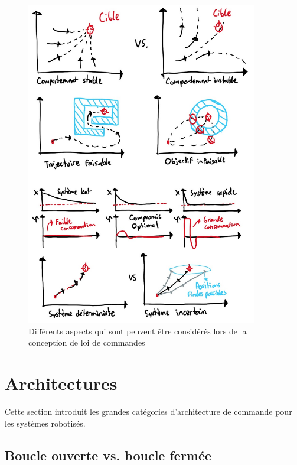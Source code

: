 \begin{figure}[htbp]
	\centering
	\includegraphics[width=0.9\textwidth]{fig/controlgoal.jpg}
	\caption{Différents aspects qui sont peuvent être considérés lors de la conception de loi de commandes}
	\label{fig:controlgoal}
\end{figure}


\section{Architectures}

Cette section introduit les grandes catégories d'architecture de commande pour les systèmes robotisés.


\subsection{Boucle ouverte vs. boucle fermée}

